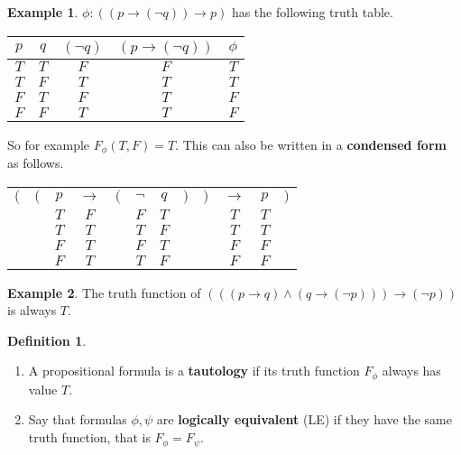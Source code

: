 \documentclass{article}
\newcommand{\rb}[1]{\left( #1 \right)}
\newcommand{\notb}[1]{\rb{\neg #1}}
\newcommand{\andb}[2]{\rb{#1 \land #2}}
\newcommand{\impb}[2]{\rb{#1 \rightarrow #2}}
\theoremstyle{definition}\newtheorem{definition}{Definition}[subsection]
\theoremstyle{definition}\newtheorem{remark}[definition]{Remark}
\theoremstyle{definition}\newtheorem*{example}{Example}
\theoremstyle{definition}\newtheorem*{note}{Note}
\begin{document}
\begin{example}
$ \phi : \impb{\impb{p}{\notb{q}}}{p} $ has the following truth table.
\begin{center}
\begin{tabular}{|c|c|c|c|c|}
\hline
$ p $ & $ q $ & $ \notb{q} $ & $ \impb{p}{\notb{q}} $ & $ \phi $ \\
\hline
$ T $ & $ T $ & $ F $ & $ F $ & $ T $ \\
\hline
$ T $ & $ F $ & $ T $ & $ T $ & $ T $ \\
\hline
$ F $ & $ T $ & $ F $ & $ T $ & $ F $ \\
\hline
$ F $ & $ F $ & $ T $ & $ T $ & $ F $ \\
\hline
\end{tabular}
\end{center}
So for example $ F_\phi\rb{T, F} = T $. This can also be written in a \textbf{condensed form} as follows.
\begin{center}
\begin{tabular}{cccccccccccc}
$ ( $ & $ ( $ & $ p $ & $ \rightarrow $ & $ ( $ & $ \neg $ & $ q $ & $ ) $ & $ ) $ & $ \rightarrow $ & $ p $ & $ ) $ \\
& & $ T $ & $ F $ & & $ F $ & $ T $ & & & $ T $ & $ T $ & \\
& & $ T $ & $ T $ & & $ T $ & $ F $ & & & $ T $ & $ T $ & \\
& & $ F $ & $ T $ & & $ F $ & $ T $ & & & $ F $ & $ F $ & \\
& & $ F $ & $ T $ & & $ T $ & $ F $ & & & $ F $ & $ F $ & \\
\end{tabular}
\end{center}
\end{example}


\begin{example}
The truth function of $ \impb{\andb{\impb{p}{q}}{\impb{q}{\notb{p}}}}{\notb{p}} $ is always $ T $.
\end{example}

\begin{definition}
\hfill
\begin{enumerate}
\item A propositional formula is a \textbf{tautology} if its truth function $ F_\phi $ always has value $ T $.
\item Say that formulas $ \phi, \psi $ are \textbf{logically equivalent} (LE) if they have the same truth function, that is $ F_\phi = F_\psi $.
\end{enumerate}
\end{definition}
\end{document}
